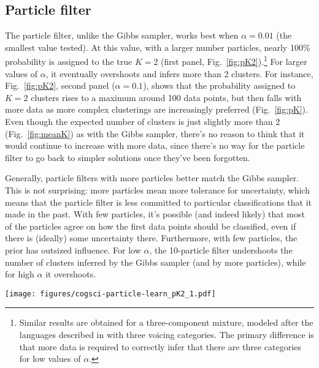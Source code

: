 \documentclass[10pt,letterpaper]{article}
\let\origfigure\figure
\let\endorigfigure\endfigure
\renewenvironment{figure}[1][2] {
    \expandafter\origfigure\expandafter[tbp]
} {
    \endorigfigure
}
\begin{document}
\hypertarget{particle-filter}{%
\subsection{Particle filter}\label{particle-filter}}

The particle filter, unlike the Gibbs sampler, works best when
\(\alpha=0.01\) (the smallest value tested). At this value, with a
larger number particles, nearly 100\% probability is assigned to the
true \(K=2\) (first panel, Fig.~\ref{fig:pK2}).\footnote{Similar results
  are obtained for a three-component mixture, modeled after the
  languages described in \textcite{Lisker1964} with three voicing
  categories. The primary difference is that more data is required to
  correctly infer that there are three categories for low values of
  \(\alpha\).} For larger values of \(\alpha\), it eventually overshoots
and infers more than 2 clusters. For instance, Fig.~\ref{fig:pK2},
second panel (\(\alpha=0.1\)), shows that the probability assigned to
\(K=2\) clusters rises to a maximum around 100 data points, but then
falls with more data as more complex clusterings are increasingly
preferred (Fig.~\ref{fig:pK}). Even though the expected number of
clusters is just slightly more than 2 (Fig.~\ref{fig:meanK}) as with the
Gibbs sampler, there's no reason to think that it would continue to
increase with more data, since there's no way for the particle filter to
go back to simpler solutions once they've been forgotten.

Generally, particle filters with more particles better match the Gibbs
sampler. This is not surprising: more particles mean more tolerance for
uncertainty, which means that the particle filter is less committed to
particular classifications that it made in the past. With few particles,
it's possible (and indeed likely) that most of the particles agree on
how the first data points should be classified, even if there is
(ideally) some uncertainty there. Furthermore, with few particles, the
prior has outsized influence. For low \(\alpha\), the 10-particle filter
undershoots the number of clusters inferred by the Gibbs sampler (and by
more particles), while for high \(\alpha\) it overshoots.

\begin{figure}
\hypertarget{fig:pK2}{%
\centering
\texttt{[image: figures/cogsci-particle-learn\_pK2\_1.pdf]}
\caption{Posterior probability correct (two-cluster solutions) for
particle filter (colors, 95\% bootstrapped CIs over runs) and Gibbs
sampler (gray horizontal lines). Gibbs sampler is shown for 1,000
observations and 1,000 samples.}\label{fig:pK2}
}
\end{figure}
\end{document}
